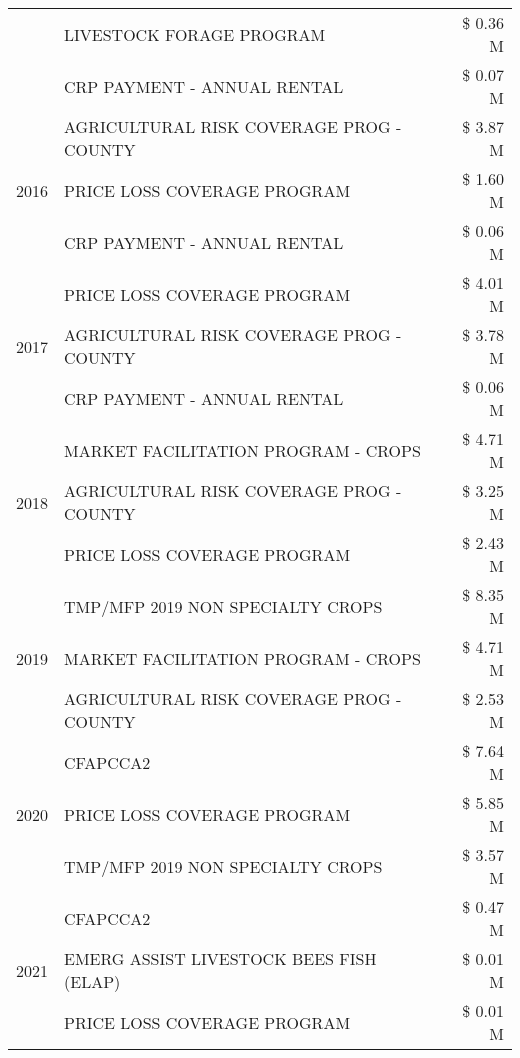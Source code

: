 \begin{tabular}{llr}
 & LIVESTOCK FORAGE PROGRAM & \$ 0.36 M \\
 & CRP PAYMENT - ANNUAL RENTAL & \$ 0.07 M \\
\cline{1-3}
\multirow[t]{3}{*}{2016} & AGRICULTURAL RISK COVERAGE PROG - COUNTY & \$ 3.87 M \\
 & PRICE LOSS COVERAGE PROGRAM & \$ 1.60 M \\
 & CRP PAYMENT - ANNUAL RENTAL & \$ 0.06 M \\
\cline{1-3}
\multirow[t]{3}{*}{2017} & PRICE LOSS COVERAGE PROGRAM & \$ 4.01 M \\
 & AGRICULTURAL RISK COVERAGE PROG - COUNTY & \$ 3.78 M \\
 & CRP PAYMENT - ANNUAL RENTAL & \$ 0.06 M \\
\cline{1-3}
\multirow[t]{3}{*}{2018} & MARKET FACILITATION PROGRAM - CROPS & \$ 4.71 M \\
 & AGRICULTURAL RISK COVERAGE PROG - COUNTY & \$ 3.25 M \\
 & PRICE LOSS COVERAGE PROGRAM & \$ 2.43 M \\
\cline{1-3}
\multirow[t]{3}{*}{2019} & TMP/MFP 2019 NON SPECIALTY CROPS & \$ 8.35 M \\
 & MARKET FACILITATION PROGRAM - CROPS & \$ 4.71 M \\
 & AGRICULTURAL RISK COVERAGE PROG - COUNTY & \$ 2.53 M \\
\cline{1-3}
\multirow[t]{3}{*}{2020} & CFAPCCA2 & \$ 7.64 M \\
 & PRICE LOSS COVERAGE PROGRAM & \$ 5.85 M \\
 & TMP/MFP 2019 NON SPECIALTY CROPS & \$ 3.57 M \\
\cline{1-3}
\multirow[t]{3}{*}{2021} & CFAPCCA2 & \$ 0.47 M \\
 & EMERG ASSIST LIVESTOCK BEES FISH (ELAP) & \$ 0.01 M \\
 & PRICE LOSS COVERAGE PROGRAM & \$ 0.01 M \\
\cline{1-3}
\bottomrule
\end{tabular}
